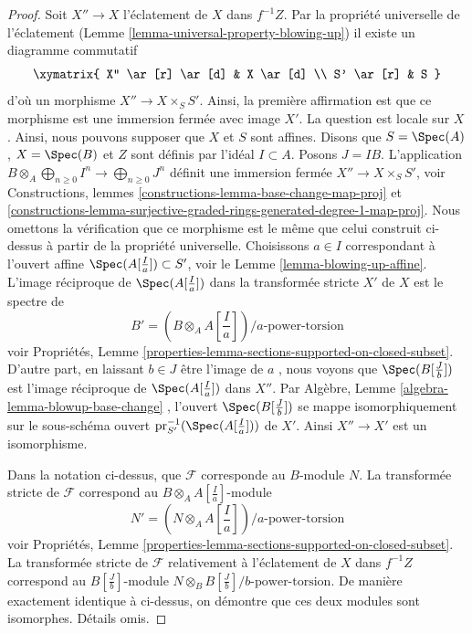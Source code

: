 \begin{proof}
Soit  $X'' \to X$  l'éclatement de  $X$  dans  $f^{-1}Z$. Par la propriété
universelle de l'éclatement (Lemme  \ref{lemma-universal-property-blowing-up}) il existe un diagramme commutatif
$$
\xymatrix{
X'' \ar[r] \ar[d] & X \ar[d] \\
S' \ar[r] & S
}
$$
d'où un morphisme  $X'' \to X \times_S S'$. Ainsi, la première affirmation est que ce
morphisme est une immersion fermée avec image  $X'$. La question est locale
sur  $X$. Ainsi, nous pouvons supposer que  $X$  et  $S$ 
sont affines. Disons que  $S = \Spec(A)$,  $X = \Spec(B)$ et  $Z$  sont définis
par l'idéal  $I \subset A$. Posons  $J = IB$. L'application  $B \otimes_A \bigoplus_{n \geq 0} I^n \to \bigoplus_{n \geq 0} J^n$  définit
une immersion fermée  $X'' \to X \times_S S'$, voir Constructions, lemmes  \ref{constructions-lemma-base-change-map-proj}  et
 \ref{constructions-lemma-surjective-graded-rings-generated-degree-1-map-proj}. Nous omettons la vérification que ce morphisme est le même que celui
construit ci-dessus à partir de la propriété universelle. Choisissons  $a \in I$ 
correspondant à l'ouvert affine  $\Spec(A[\frac{I}{a}]) \subset S'$, voir le Lemme  \ref{lemma-blowing-up-affine}. L'image
réciproque de  $\Spec(A[\frac{I}{a}])$  dans la transformée stricte  $X'$  de
 $X$  est le spectre de
$$
B' = (B \otimes_A A[\textstyle{\frac{I}{a}}])/a\text{-power-torsion}
$$
voir Propriétés, Lemme  \ref{properties-lemma-sections-supported-on-closed-subset}. D'autre part, en laissant  $b \in J$  être
l'image de  $a$ , nous voyons que  $\Spec(B[\frac{J}{b}])$  est l'image réciproque de
 $\Spec(A[\frac{I}{a}])$  dans  $X''$. Par Algèbre, Lemme  \ref{algebra-lemma-blowup-base-change} , l'ouvert
 $\Spec(B[\frac{J}{b}])$  se mappe isomorphiquement sur le sous-schéma ouvert  $\text{pr}_{S'}^{-1}(\Spec(A[\frac{I}{a}]))$  de
 $X'$. Ainsi  $X'' \to X'$  est un isomorphisme.

\medskip\noindent
Dans la notation ci-dessus, que  $\mathcal{F}$  corresponde au  $B$-module
 $N$. La transformée stricte de  $\mathcal{F}$  correspond au
 $B \otimes_A A[\frac{I}{a}]$-module
$$
N' = (N \otimes_A A[\textstyle{\frac{I}{a}}])/a\text{-power-torsion}
$$
voir Propriétés, Lemme  \ref{properties-lemma-sections-supported-on-closed-subset}. La transformée stricte de  $\mathcal{F}$ 
relativement à l'éclatement de  $X$  dans  $f^{-1}Z$  correspond au
 $B[\frac{J}{b}]$-module  $N \otimes_B B[\frac{J}{b}]/b\text{-power-torsion}$. De manière exactement identique à ci-dessus, on
démontre que ces deux modules sont isomorphes. Détails omis.
\end{proof}

